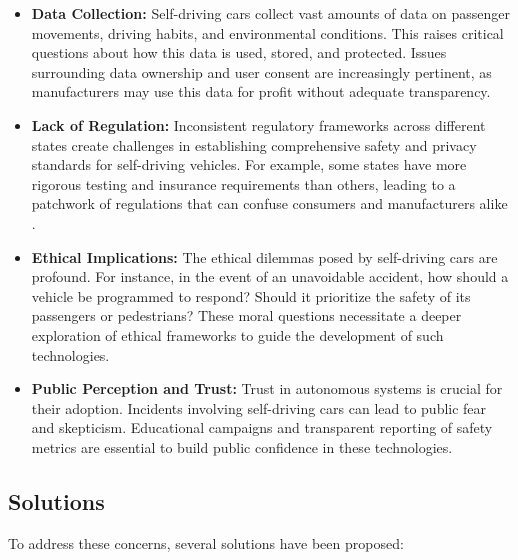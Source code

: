 \begin{itemize}
    \item \textbf{Data Collection:} Self-driving cars collect vast amounts of data on passenger movements, driving habits, and environmental conditions. This raises critical questions about how this data is used, stored, and protected. Issues surrounding data ownership and user consent are increasingly pertinent, as manufacturers may use this data for profit without adequate transparency.
    \item \textbf{Lack of Regulation:} Inconsistent regulatory frameworks across different states create challenges in establishing comprehensive safety and privacy standards for self-driving vehicles. For example, some states have more rigorous testing and insurance requirements than others, leading to a patchwork of regulations that can confuse consumers and manufacturers alike \cite{usc_viterbi}.
    \item \textbf{Ethical Implications:} The ethical dilemmas posed by self-driving cars are profound. For instance, in the event of an unavoidable accident, how should a vehicle be programmed to respond? Should it prioritize the safety of its passengers or pedestrians? These moral questions necessitate a deeper exploration of ethical frameworks to guide the development of such technologies.
    \item \textbf{Public Perception and Trust:} Trust in autonomous systems is crucial for their adoption. Incidents involving self-driving cars can lead to public fear and skepticism. Educational campaigns and transparent reporting of safety metrics are essential to build public confidence in these technologies.
\end{itemize}

\subsection{Solutions}
To address these concerns, several solutions have been proposed:

